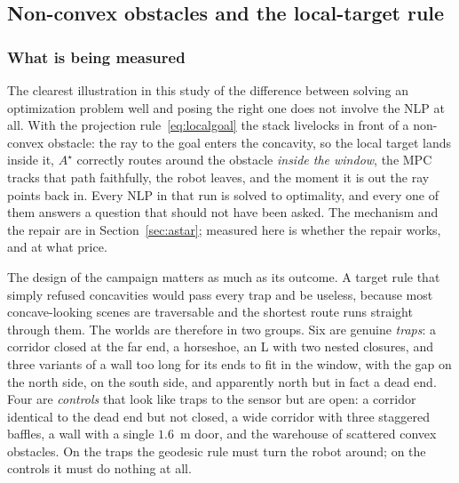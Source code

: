 \documentclass[11pt,a4paper]{article}
\newcommand{\astar}{$A^\star$}
\begin{document}
\subsection{Non-convex obstacles and the local-target rule}
\label{sec:nonconvex}

\subsubsection{What is being measured}
\label{sec:localmin}

The clearest illustration in this study of the difference between solving an optimization problem well and
posing the right one does not involve the NLP at all. With the projection rule~\eqref{eq:localgoal} the
stack livelocks in front of a non-convex obstacle: the ray to the goal enters the concavity, so the local
target lands inside it, \astar{} correctly routes around the obstacle \emph{inside the window}, the MPC
tracks that path faithfully, the robot leaves, and the moment it is out the ray points back in. Every NLP in
that run is solved to optimality, and every one of them answers a question that should not have been asked.
The mechanism and the repair are in Section~\ref{sec:astar}; measured here is whether the repair works, and
at what price.

The design of the campaign matters as much as its outcome. A target rule that simply refused concavities
would pass every trap and be useless, because most concave-looking scenes are traversable and the shortest
route runs straight through them. The worlds are therefore in two groups. Six are genuine \emph{traps}: a
corridor closed at the far end, a horseshoe, an L with two nested closures, and three variants of a wall too
long for its ends to fit in the window, with the gap on the north side, on the south side, and apparently
north but in fact a dead end. Four are \emph{controls} that look like traps to the sensor but are open: a
corridor identical to the dead end but not closed, a wide corridor with three staggered baffles, a wall with
a single $1.6$~m door, and the warehouse of scattered convex obstacles. On the traps the geodesic rule must
turn the robot around; on the controls it must do nothing at all.
\end{document}
